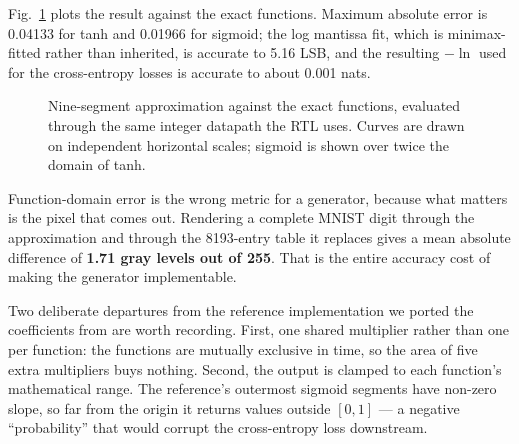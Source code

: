 \documentclass[conference,a4paper]{APSIPA2026}
\begin{document}
Fig.~\ref{fig:pwl} plots the result against the exact functions. Maximum absolute error is 0.04133 for tanh and 0.01966 for sigmoid; the log mantissa fit, which is minimax-fitted rather than inherited, is accurate to 5.16 LSB, and the resulting $-\ln$ used for the cross-entropy losses is accurate to about 0.001 nats.

\begin{figure}[t]
\centering
{}
\caption{Nine-segment approximation against the exact functions, evaluated through the same integer datapath the RTL uses. Curves are drawn on independent horizontal scales; sigmoid is shown over twice the domain of tanh.}
\label{fig:pwl}
\end{figure}

Function-domain error is the wrong metric for a generator, because what matters is the pixel that comes out. Rendering a complete MNIST digit through the approximation and through the 8193-entry table it replaces gives a mean absolute difference of \textbf{1.71 gray levels out of 255}. That is the entire accuracy cost of making the generator implementable.

Two deliberate departures from the reference implementation we ported the coefficients from are worth recording. First, one shared multiplier rather than one per function: the functions are mutually exclusive in time, so the area of five extra multipliers buys nothing. Second, the output is clamped to each function's mathematical range. The reference's outermost sigmoid segments have non-zero slope, so far from the origin it returns values outside $[0,1]$ --- a negative ``probability'' that would corrupt the cross-entropy loss downstream.
\end{document}
